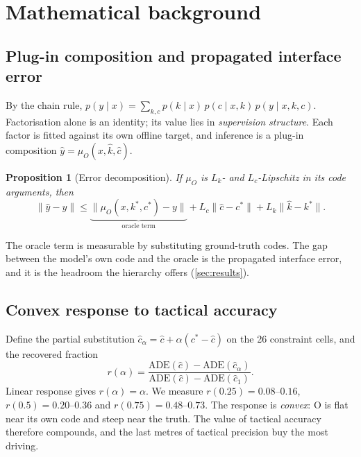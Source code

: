 \documentclass[10pt,twocolumn]{article}
\newtheorem{proposition}{Proposition}
\theoremstyle{remark}
\newcommand{\ADE}{\mathrm{ADE}}
\begin{document}
\section{Mathematical background}\label{sec:math}

\subsection{Plug-in composition and propagated interface error}
By the chain rule, $p(y\mid x)=\sum_{k,c}p(k\mid x)\,p(c\mid x,k)\,p(y\mid x,k,c)$. Factorisation alone is an identity; its value lies in
\emph{supervision structure}. Each factor is fitted against its own offline target, and inference is a plug-in composition
$\hat y=\mu_O(x,\hat k,\hat c)$.
\begin{proposition}[Error decomposition]\label{prop:lip}
If $\mu_O$ is $L_k$- and $L_c$-Lipschitz in its code arguments, then
\begin{equation}
\|\hat y-y\|\le\underbrace{\|\mu_O(x,k^\ast,c^\ast)-y\|}_{\text{oracle term}}+L_c\|\hat c-c^\ast\|+L_k\|\hat k-k^\ast\|.
\end{equation}
\end{proposition}
\noindent The oracle term is measurable by substituting ground-truth codes. The gap between the model's own code and the oracle is
the propagated interface error, and it is the headroom the hierarchy offers (\cref{sec:results}).

\subsection{Convex response to tactical accuracy}
Define the partial substitution $\hat c_\alpha=\hat c+\alpha(c^\ast-\hat c)$ on the 26 constraint cells, and the recovered fraction
\begin{equation}
r(\alpha)=\frac{\ADE(\hat c)-\ADE(\hat c_\alpha)}{\ADE(\hat c)-\ADE(\hat c_1)} .
\end{equation}
Linear response gives $r(\alpha)=\alpha$. We measure $r(0.25)=0.08$--$0.16$, $r(0.5)=0.20$--$0.36$ and $r(0.75)=0.48$--$0.73$. The
response is \emph{convex}: O is flat near its own code and steep near the truth. The value of tactical accuracy therefore compounds,
and the last metres of tactical precision buy the most driving.
\end{document}
